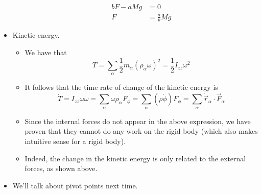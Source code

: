 \documentclass[../notes.tex]{subfiles}
\begin{document}
\begin{itemize}
\begin{itemize}
\begin{align*}
            bF-aMg &= 0\\
            F &= \frac{a}{b}Mg
        \end{align*}
    \end{itemize}
    \item Kinetic energy.
    \begin{itemize}
        \item We have that
        \begin{equation*}
            T = \sum_\alpha\frac{1}{2}m_\alpha(\rho_\alpha\omega)^2
            = \frac{1}{2}I_{zz}\omega^2
        \end{equation*}
        \item It follows that the time rate of change of the kinetic energy is
        \begin{equation*}
            \dot{T} = I_{zz}\omega\dot{\omega}
            = \sum_\alpha\omega\rho_\alpha F_\phi
            = \sum_\alpha(\rho\dot{\phi})F_\phi
            = \sum_\alpha\dot{\vec{r}}_\alpha\cdot\vec{F}_\alpha
        \end{equation*}
        \item Since the internal forces do not appear in the above expression, we have proven that they cannot do any work on the rigid body (which also makes intuitive sense for a rigid body).
        \item Indeed, the change in the kinetic energy is only related to the external forces, as shown above.
    \end{itemize}
    \item We'll talk about pivot points next time.
\end{itemize}
\end{document}

